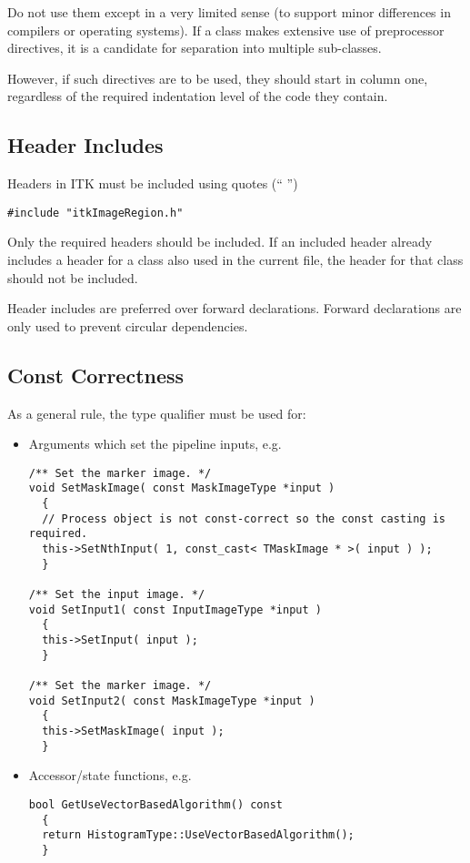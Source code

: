 Do not use them except in a very limited sense (to support minor differences
in compilers or operating systems). If a class makes extensive use of
preprocessor directives, it is a candidate for separation into multiple
sub-classes.

However, if such directives are to be used, they should start in column one,
regardless of the required indentation level of the code they contain.


\subsection{Header Includes}
\label{subsec:HeaderIncludes}

Headers in ITK must be included using quotes (`` '')

\small
\begin{verbatim}
#include "itkImageRegion.h"
\end{verbatim}
\normalsize

Only the required headers should be included. If an included header already
includes a header for a class also used in the current file, the header for that
class should not be included.

Header includes are preferred over forward declarations. Forward declarations
are only used to prevent circular dependencies.


\subsection{Const Correctness}
\label{subsec:ConstCorrectness}

As a general rule, the  type qualifier must be used for:
\begin{itemize}
\item Arguments which set the pipeline inputs, e.g.

\small
\begin{verbatim}
/** Set the marker image. */
void SetMaskImage( const MaskImageType *input )
  {
  // Process object is not const-correct so the const casting is required.
  this->SetNthInput( 1, const_cast< TMaskImage * >( input ) );
  }

/** Set the input image. */
void SetInput1( const InputImageType *input )
  {
  this->SetInput( input );
  }

/** Set the marker image. */
void SetInput2( const MaskImageType *input )
  {
  this->SetMaskImage( input );
  }
\end{verbatim}
\normalsize

\item Accessor/state functions, e.g.

\small
\begin{verbatim}
bool GetUseVectorBasedAlgorithm() const
  {
  return HistogramType::UseVectorBasedAlgorithm();
  }
\end{verbatim}
\normalsize

\end{itemize}


